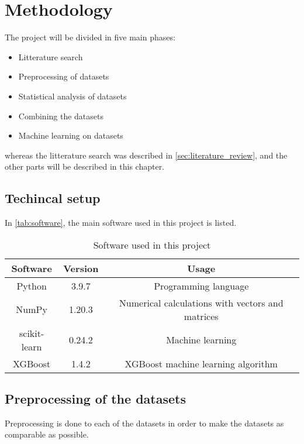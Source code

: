 \chapter{Methodology}
\label{cha:Methodology}

The project will be divided in five main phases:
\begin{itemize}
    \item Litterature search
    \item Preprocessing of datasets
    \item Statistical analysis of datasets
    \item Combining the datasets
    \item Machine learning on datasets
\end{itemize}
whereas the litterature search was described in \autoref{sec:literature_review}, and the other parts will be described in this chapter.

\section{Techincal setup}
In \autoref{tab:software}, the main software used in this project is listed.

\begin{table}[ht]
    \centering
    \begin{tabular}{|c|c|c|}
       \hline
       Software & Version & Usage \\
       \hline 
       Python\tablefootnote{\url{https://www.python.org}} & 3.9.7 & Programming language \\
       \hline
       NumPy\tablefootnote{\url{https://numpy.org}} & 1.20.3 & Numerical calculations with vectors and matrices \\
       \hline
       scikit-learn\tablefootnote{\url{https://scikit-learn.org/}} & 0.24.2 & Machine learning \\
       \hline
       XGBoost\tablefootnote{\url{https://xgboost.readthedocs.io/}} & 1.4.2 & XGBoost machine learning algorithm \\
       \hline
    \end{tabular}
    \caption{Software used in this project}
    \label{tab:software}
\end{table}

\section{Preprocessing of the datasets}
Preprocessing is done to each of the datasets in order to make the datasets as comparable as possible.


